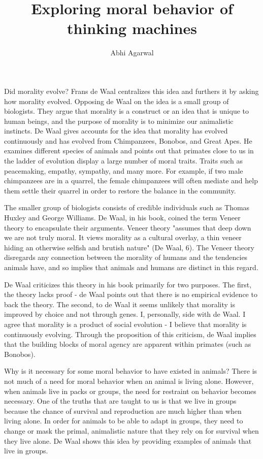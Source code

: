 \documentclass[11pt, oneside]{article}
\title{Exploring moral behavior of thinking machines}
\author{Abhi Agarwal}
\date{}
\begin{document}
\maketitle

\par Did morality evolve? Frans de Waal centralizes this idea and furthers it by asking how morality evolved. Opposing de Waal on the idea is a small group of biologists. They argue that morality is a construct or an idea that is unique to human beings, and the purpose of morality is to minimize our animalistic instincts. De Waal gives accounts for the idea that morality has evolved continuously and has evolved from Chimpanzees, Bonobos, and Great Apes. He examines different species of animals and points out that primates close to us in the ladder of evolution display a large number of moral traits. Traits such as peacemaking, empathy, sympathy, and many more. For example, if two male chimpanzees are in a quarrel, the female chimpanzees will often mediate and help them settle their quarrel in order to restore the balance in the community.
 
\par The smaller group of biologists consists of credible individuals such as Thomas Huxley and George Williams. De Waal, in his book, coined the term Veneer theory to encapsulate their arguments. Veneer theory "assumes that deep down we are not truly moral. It views morality as a cultural overlay, a thin veneer hiding an otherwise selfish and brutish nature" (De Waal, 6). The Veneer theory disregards any connection between the morality of humans and the tendencies animals have, and so implies that animals and humans are distinct in this regard.
 
\par De Waal criticizes this theory in his book primarily for two purposes. The first, the theory lacks proof - de Waal points out that there is no empirical evidence to back the theory. The second, to de Waal it seems unlikely that morality is improved by choice and not through genes.
I, personally, side with de Waal. I agree that morality is a product of social evolution - I believe that morality is continuously evolving. Through the proposition of this criticism, de Waal implies that the building blocks of moral agency are apparent within primates (such as Bonobos).
 
\par Why is it necessary for some moral behavior to have existed in animals? There is not much of a need for moral behavior when an animal is living alone. However, when animals live in packs or groups, the need for restraint on behavior becomes necessary. One of the truths that are taught to us is that we live in groups because the chance of survival and reproduction are much higher than when living alone. In order for animals to be able to adapt in groups, they need to change or mask the primal, animalistic nature that they rely on for survival when they live alone. De Waal shows this idea by providing examples of animals that live in groups.  
 
\end{document}
